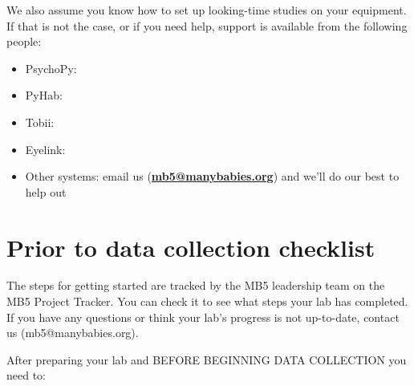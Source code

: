 \documentclass[
  letterpaper,
  DIV=11,
  numbers=noendperiod,
  oneside]{scrreprt}
\providecommand{\tightlist}{%
  \setlength{\itemsep}{0pt}\setlength{\parskip}{0pt}}
\begin{document}
We also assume you know how to set up looking-time studies on your
equipment. If that is not the case, or if you need help, support is
available from the following people:

\begin{itemize}
\tightlist
\item
  PsychoPy:
\item
  PyHab:
\item
  Tobii:
\item
  Eyelink:
\item
  Other systems: email us
  (\href{mailto:mb5@manybabies.org}{\textbf{mb5@manybabies.org}}) and
  we'll do our best to help out
\end{itemize}

\chapter{Prior to data collection
checklist}\label{prior-to-data-collection-checklist}

The steps for getting started are tracked by the MB5 leadership team on
the MB5 Project Tracker. You can check it to see what steps your lab has
completed. If you have any questions or think your lab's progress is not
up-to-date, contact us (mb5@manybabies.org).

After preparing your lab and BEFORE BEGINNING DATA COLLECTION you need
to:
\end{document}
